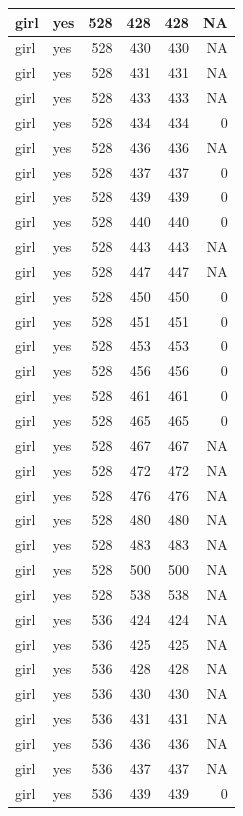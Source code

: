 \documentclass[man]{apa6}
\begin{document}
\begin{tabular}{l|l|r|r|r|r}
\hline
girl & yes & 528 & 428 & 428 & NA\\
\hline
girl & yes & 528 & 430 & 430 & NA\\
\hline
girl & yes & 528 & 431 & 431 & NA\\
\hline
girl & yes & 528 & 433 & 433 & NA\\
\hline
girl & yes & 528 & 434 & 434 & 0\\
\hline
girl & yes & 528 & 436 & 436 & NA\\
\hline
girl & yes & 528 & 437 & 437 & 0\\
\hline
girl & yes & 528 & 439 & 439 & 0\\
\hline
girl & yes & 528 & 440 & 440 & 0\\
\hline
girl & yes & 528 & 443 & 443 & NA\\
\hline
girl & yes & 528 & 447 & 447 & NA\\
\hline
girl & yes & 528 & 450 & 450 & 0\\
\hline
girl & yes & 528 & 451 & 451 & 0\\
\hline
girl & yes & 528 & 453 & 453 & 0\\
\hline
girl & yes & 528 & 456 & 456 & 0\\
\hline
girl & yes & 528 & 461 & 461 & 0\\
\hline
girl & yes & 528 & 465 & 465 & 0\\
\hline
girl & yes & 528 & 467 & 467 & NA\\
\hline
girl & yes & 528 & 472 & 472 & NA\\
\hline
girl & yes & 528 & 476 & 476 & NA\\
\hline
girl & yes & 528 & 480 & 480 & NA\\
\hline
girl & yes & 528 & 483 & 483 & NA\\
\hline
girl & yes & 528 & 500 & 500 & NA\\
\hline
girl & yes & 528 & 538 & 538 & NA\\
\hline
girl & yes & 536 & 424 & 424 & NA\\
\hline
girl & yes & 536 & 425 & 425 & NA\\
\hline
girl & yes & 536 & 428 & 428 & NA\\
\hline
girl & yes & 536 & 430 & 430 & NA\\
\hline
girl & yes & 536 & 431 & 431 & NA\\
\hline
girl & yes & 536 & 436 & 436 & NA\\
\hline
girl & yes & 536 & 437 & 437 & NA\\
\hline
girl & yes & 536 & 439 & 439 & 0\\

\end{tabular}
\end{document}
